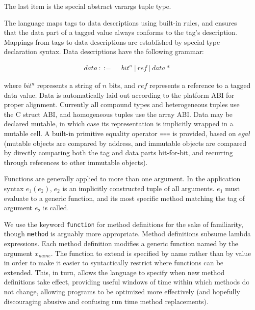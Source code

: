 \noindent
The last item is the special abstract varargs tuple type.

The language maps tags to data descriptions using built-in rules, and ensures that
the data part of a tagged value always conforms to the tag's description.
Mappings from tags to data descriptions are established by special type
declaration syntax.
Data descriptions have the following grammar:

\vspace{-3ex}
\begin{singlespace}
\begin{align*}
data\ ::=\ &\ bit^n\ |\ ref\ |\ data*
\end{align*}
\end{singlespace}

\noindent
where $bit^n$ represents a string of $n$ bits, and $ref$ represents a reference
to a tagged data value.
Data is automatically laid out according to the platform ABI for proper
alignment.
Currently all compound types and heterogeneous tuples use the C struct ABI, and
homogeneous tuples use the array ABI.
Data may be declared mutable, in which case its representation is implicitly
wrapped in a mutable cell.
A built-in primitive equality operator \texttt{===} is provided, based on
$egal$ \cite{egal} (mutable objects are compared by address, and immutable objects
are compared by directly comparing both the tag and data parts bit-for-bit, and
recurring through references to other immutable objects).

Functions are generally applied to more than one argument. In the application
syntax $e_1(e_2)$, $e_2$ is an implicitly constructed tuple of all arguments.
$e_1$ must evaluate to a generic function, and its most specific method
matching the tag of argument $e_2$ is called.

We use the keyword \texttt{function} for method definitions for the sake of
familiarity, though \texttt{method} is arguably more appropriate. Method
definitions subsume lambda expressions. Each method definition modifies a
generic function named by the argument $x_{name}$. The function to extend is
specified by name rather than by value in order to make it easier to syntactically
restrict where functions can be extended. This, in turn, allows the language to
specify when new method definitions take effect, providing useful windows of
time within which methods do not change, allowing programs to be optimized more
effectively (and hopefully discouraging abusive and confusing run time
method replacements).

